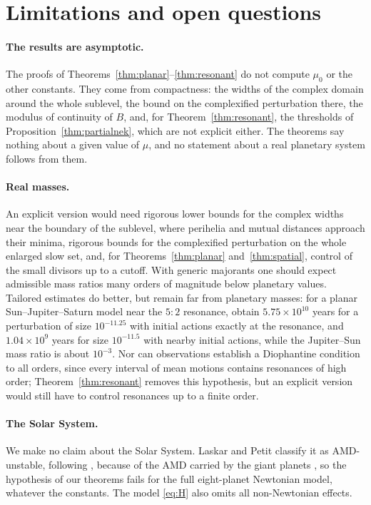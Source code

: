\section{Limitations and open questions}\label{sec:outlook}

\paragraph{The results are asymptotic.}
The proofs of Theorems~\ref{thm:planar}--\ref{thm:resonant} do not compute $\mu_0$ or the other constants. They
come from compactness: the widths of the complex domain around the whole sublevel, the bound on the complexified
perturbation there, the modulus of continuity of $B$, and, for Theorem~\ref{thm:resonant}, the thresholds of
Proposition~\ref{thm:partialnek}, which are not explicit either. The theorems say nothing about a given value of
$\mu$, and no statement about a real planetary system follows from them.

\paragraph{Real masses.}
An explicit version would need rigorous lower bounds for the complex widths near the boundary of the sublevel,
where perihelia and mutual distances approach their minima, rigorous bounds for the complexified perturbation
on the whole enlarged slow set, and, for Theorems~\ref{thm:planar} and~\ref{thm:spatial}, control of the small
divisors up to a cutoff. With generic majorants one should expect admissible mass ratios many orders of magnitude
below planetary values. Tailored estimates do better, but remain far from planetary masses: for a planar
Sun--Jupiter--Saturn model near the $5{:}2$ resonance, \cite[\S5.1, Tables~1 and~3]{BN20} obtain
$5.75\times10^{10}$ years for a perturbation of size $10^{-11.25}$ with initial actions exactly at the resonance,
and $1.04\times10^9$ years for size $10^{-11.5}$ with nearby initial actions, while the Jupiter--Sun mass ratio is
about $10^{-3}$. Nor can observations establish a Diophantine condition to all orders, since every
interval of mean motions contains resonances of high order; Theorem~\ref{thm:resonant} removes this hypothesis,
but an explicit version would still have to control resonances up to a finite order.

\paragraph{The Solar System.}
We make no claim about the Solar System. Laskar and Petit classify it as AMD-unstable, following
\cite{Las97}, because of the AMD carried by the giant planets \cite[\S5.4.1]{LP17}, so the hypothesis of our theorems fails for the full eight-planet Newtonian
model, whatever the constants. The model \eqref{eq:H} also omits all non-Newtonian effects.

